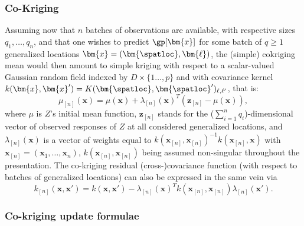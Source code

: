 \subsubsection{Co-Kriging}
\label{sec:cokriging}
Assuming now that $n$ batches of observations are available, with respective sizes $q_1,\dots, q_n$, and that one wishes 
to predict $\gp[\bm{x}]$ for some batch of $q\geq 1$ generalized locations $\bm{x}=(\bm{\spatloc}, \bm{\ell})$, the (simple) 
cokriging mean would then amount to simple kriging with respect to a scalar-valued Gaussian random field indexed by 
$D\times \{1\dots,p\}$ and with covariance kernel $k(\bm{x}, \bm{x}')=K(\bm{\spatloc}, \bm{\spatloc}')_{\ell, \ell'}$, that is:
%
\begin{equation}
\mu_{[n]}(\bm{x})=\mu(\bm{x})+\lambda_{[n]}(\bm{x})^T (\mathbf{z}_{[n]}-\mu(\bm{x})),
\end{equation}
where $\mu$ is $Z$'s initial mean function, $\mathbf{z}_{[n]}$ stands for the ($\sum_{i=1}^n q_i$)-dimensional vector of 
observed responses of $Z$ at all considered generalized locations, and $\lambda_{[n]}(\bm{x})$ is a vector of weights 
equal to $k(\bm{x}_{[n]}, \bm{x}_{[n]})^{-1} k(\bm{x}_{[n]}, \bm{x})$ with $\bm{x}_{[n]}=(\bm{x}_1,\dots, \bm{x}_n)$, 
$k(\bm{x}_{[n]}, \bm{x}_{[n]})$ being assumed non-singular throughout the presentation. The co-kriging %
residual (cross-)covariance function (with respect to batches of generalized locations) can also be expressed in the same vein via
%
\begin{equation}
k_{[n]}(\bm{x},\bm{x}')=k(\bm{x},\bm{x}')-\lambda_{[n]}(\bm{x})^T k(\bm{x}_{[n]}, \bm{x}_{[n]}) \lambda_{{[n]}}(\bm{x}').
\end{equation}

\subsubsection{Co-kriging update formulae}

